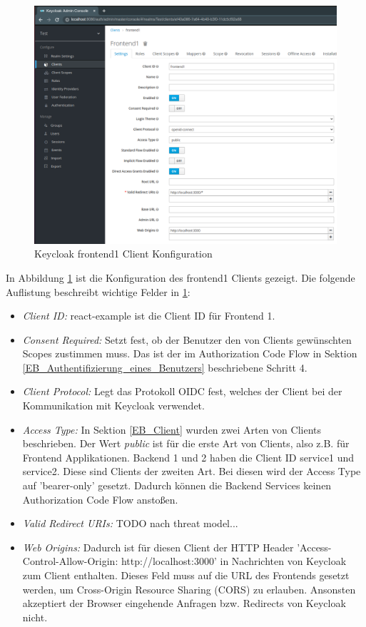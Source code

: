 \begin{figure}[!ht]
	\centering
	\includegraphics[width=1\textwidth]{Images/Ebert/KeycloakClientConfig.PNG}
	\caption{Keycloak frontend1 Client Konfiguration}
	\label{fig:EB_Keycloak frontend1 Client Konfiguration}
\end{figure}

In Abbildung \ref{fig:EB_Keycloak frontend1 Client Konfiguration} ist die Konfiguration des frontend1 Clients gezeigt. Die folgende Auflistung beschreibt wichtige Felder in \ref{fig:EB_Keycloak frontend1 Client Konfiguration}:
\begin{itemize}
	\item \emph{Client ID:} react-example ist die Client ID für Frontend 1.
	\item \emph{Consent Required:} Setzt fest, ob der Benutzer den von Clients gewünschten Scopes zustimmen muss. Das ist der im Authorization Code Flow in Sektion \ref{EB_Authentifizierung_eines_Benutzers} beschriebene Schritt 4.
	\item \emph{Client Protocol:} Legt das Protokoll OIDC fest, welches der Client bei der Kommunikation mit Keycloak verwendet.
	\item \emph{Access Type:} In Sektion \ref{EB_Client} wurden zwei Arten von Clients beschrieben. Der Wert \textit{public} ist für die erste Art von Clients, also z.B. für Frontend Applikationen. Backend 1 und 2 haben die Client ID service1 und service2. Diese sind Clients der zweiten Art. Bei diesen wird der Access Type auf 'bearer-only' gesetzt. Dadurch können die Backend Services keinen Authorization Code Flow anstoßen.
	\item \emph{Valid Redirect URIs:} TODO nach threat model...
	\item \emph{Web Origins:} Dadurch ist für diesen Client der HTTP Header 'Access-Control-Allow-Origin: http://localhost:3000' in Nachrichten von Keycloak zum Client enthalten. Dieses Feld muss auf die URL des Frontends gesetzt werden, um Cross-Origin Resource Sharing (CORS) zu erlauben. Ansonsten akzeptiert der Browser eingehende Anfragen bzw. Redirects von Keycloak nicht.
\end{itemize}

